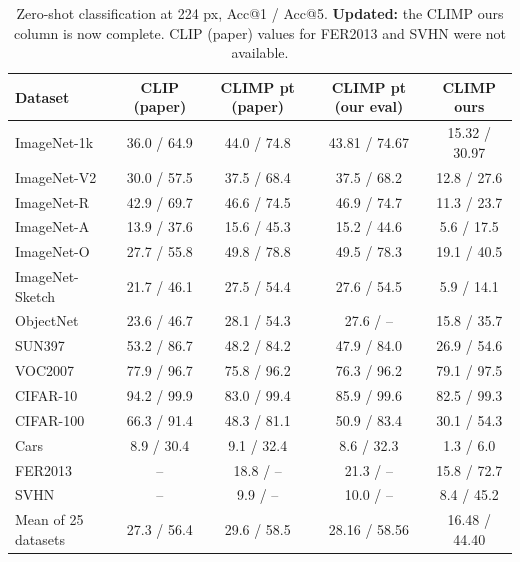 \documentclass[a4paper,10pt]{article}
\begin{document}
\begin{table}[!htbp]
\centering
\caption{Zero-shot classification at 224 px, Acc@1 / Acc@5. \textbf{Updated:} the CLIMP ours column is now complete. CLIP (paper) values for FER2013 and SVHN were not available.}
\label{tab:zeroshot}
\begin{tabular}{lcccc}
\toprule
Dataset & CLIP (paper) & CLIMP pt (paper) & CLIMP pt (our eval) & CLIMP ours \\
\midrule
ImageNet-1k     & 36.0 / 64.9 & 44.0 / 74.8 & 43.81 / 74.67 & 15.32 / 30.97 \\
ImageNet-V2     & 30.0 / 57.5 & 37.5 / 68.4 & 37.5 / 68.2   & 12.8 / 27.6   \\
ImageNet-R      & 42.9 / 69.7 & 46.6 / 74.5 & 46.9 / 74.7   & 11.3 / 23.7   \\
ImageNet-A      & 13.9 / 37.6 & 15.6 / 45.3 & 15.2 / 44.6   & 5.6 / 17.5    \\
ImageNet-O      & 27.7 / 55.8 & 49.8 / 78.8 & 49.5 / 78.3   & 19.1 / 40.5   \\
ImageNet-Sketch & 21.7 / 46.1 & 27.5 / 54.4 & 27.6 / 54.5   & 5.9 / 14.1    \\
ObjectNet       & 23.6 / 46.7 & 28.1 / 54.3 & 27.6 / --     & 15.8 / 35.7   \\
SUN397          & 53.2 / 86.7 & 48.2 / 84.2 & 47.9 / 84.0   & 26.9 / 54.6   \\
VOC2007         & 77.9 / 96.7 & 75.8 / 96.2 & 76.3 / 96.2   & 79.1 / 97.5   \\
CIFAR-10        & 94.2 / 99.9 & 83.0 / 99.4 & 85.9 / 99.6   & 82.5 / 99.3   \\
CIFAR-100       & 66.3 / 91.4 & 48.3 / 81.1 & 50.9 / 83.4   & 30.1 / 54.3   \\
Cars            & 8.9 / 30.4  & 9.1 / 32.4  & 8.6 / 32.3    & 1.3 / 6.0     \\
FER2013         & --          & 18.8 / --   & 21.3 / --     & 15.8 / 72.7   \\
SVHN            & --          & 9.9 / --    & 10.0 / --     & 8.4 / 45.2    \\
\midrule
Mean of 25 datasets & 27.3 / 56.4 & 29.6 / 58.5 & 28.16 / 58.56 & 16.48 / 44.40 \\
\bottomrule
\end{tabular}
\end{table}

\setcounter{table}{6}
\end{document}
